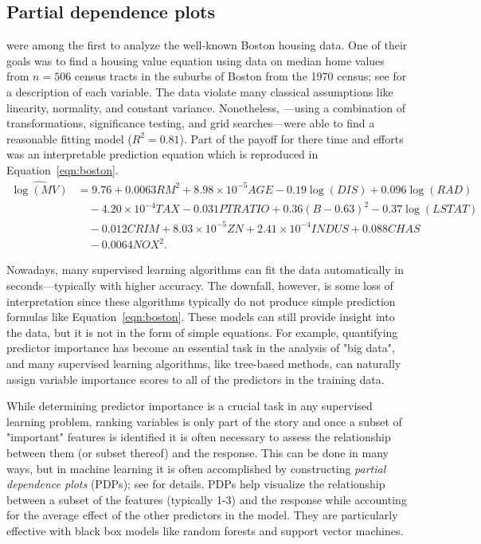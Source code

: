 \documentclass{article}
\begin{document}
\subsection{Partial dependence plots}

\citet{harrison-1978-hedonic} were among the first to analyze the well-known Boston housing data. One of their goals was to find a housing value equation using data on median home values from $n = 506$ census tracts in the suburbs of Boston from the 1970 census; see \citet[Table IV]{harrison-1978-hedonic} for a description of each variable. The data violate many classical assumptions like linearity, normality, and constant variance. Nonetheless, \citeauthor{harrison-1978-hedonic}---using a combination of transformations, significance testing, and grid searches---were able to find a reasonable fitting model ($R^2 = 0.81$). Part of the payoff for there time and efforts was an interpretable prediction equation which is reproduced in Equation~\eqref{eqn:boston}.
\begin{equation}
\label{eqn:boston}
\begin{aligned}
\widehat{\log\left(MV\right)} &= 9.76 + 0.0063 RM^2 + 8.98\times10^{-5} AGE - 0.19\log\left(DIS\right) + 0.096\log\left(RAD\right) \\
  & \quad - 4.20\times10^{-4} TAX - 0.031 PTRATIO + 0.36\left(B - 0.63\right)^2 - 0.37\log\left(LSTAT\right) \\
  & \quad - 0.012 CRIM + 8.03\times10^{-5} ZN + 2.41\times10^{-4} INDUS + 0.088 CHAS \\
  & \quad - 0.0064 NOX^2.
\end{aligned}
\end{equation}

Nowadays, many supervised learning algorithms can fit the data automatically in seconds---typically with higher accuracy. The downfall, however, is some loss of interpretation since these algorithms typically do not produce simple prediction formulas like Equation~\eqref{eqn:boston}. These models can still provide insight into the data, but it is not in the form of simple equations. For example, quantifying predictor importance has become an essential task in the analysis of "big data", and many supervised learning algorithms, like tree-based methods, can naturally assign variable importance scores to all of the predictors in the training data.

While determining predictor importance is a crucial task in any supervised learning problem, ranking variables is only part of the story and once a subset of "important" features is identified it is often necessary to assess the relationship between them (or subset thereof) and the response. This can be done in many ways, but in machine learning it is often accomplished by constructing \textit{partial dependence plots} (PDPs); see \citet{friedman-2001-greedy} for details. PDPs help visualize the relationship between a subset of the features (typically 1-3) and the response while accounting for the average effect of the other predictors in the model. They are particularly effective with black box models like random forests and support vector machines.
\end{document}
